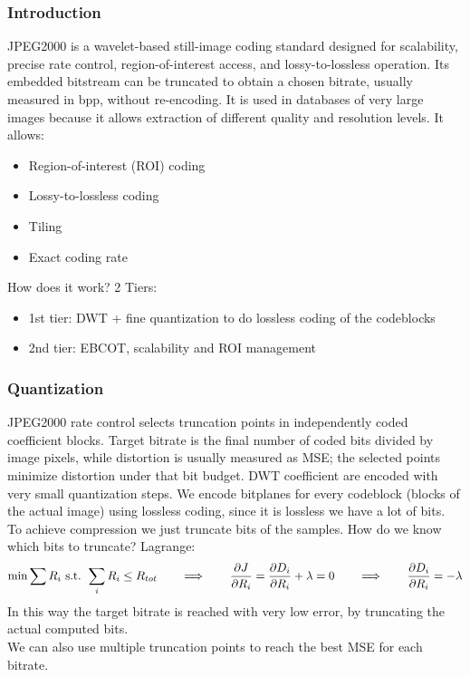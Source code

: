 \subsubsection{Introduction}
JPEG2000 is a wavelet-based still-image coding standard designed for scalability, precise rate control, region-of-interest access, and lossy-to-lossless operation. Its embedded bitstream can be truncated to obtain a chosen bitrate, usually measured in bpp, without re-encoding. It is used in databases of very large images because it allows extraction of different quality and resolution levels. It allows:
\begin{itemize}
    \item Region-of-interest (ROI) coding
    \item Lossy-to-lossless coding
    \item Tiling
    \item Exact coding rate
\end{itemize}
How does it work? 2 Tiers:
\begin{itemize}
    \item 1st tier: DWT + fine quantization to do lossless coding of the codeblocks
    \item 2nd tier: EBCOT, scalability and ROI management
\end{itemize}
\subsubsection{Quantization}
JPEG2000 rate control selects truncation points in independently coded coefficient blocks. Target bitrate is the final number of coded bits divided by image pixels, while distortion is usually measured as MSE; the selected points minimize distortion under that bit budget.
DWT coefficient are encoded with very small quantization steps. We encode bitplanes for every codeblock (blocks of the actual image) using lossless coding, since it is lossless we have a lot of bits.\\
To achieve compression we just truncate bits of the samples. How do we know which bits to truncate? Lagrange:
$$\min\sum R_i \text{ s.t. }\sum_{i}^{}R_i \leq R_{tot} \qquad \Longrightarrow \qquad \frac{\partial J}{\partial R_i} = \frac{\partial D_i}{\partial R_i} + \lambda = 0 \qquad\Longrightarrow\qquad \frac{\partial D_i}{\partial R_i} = -\lambda$$
In this way the target bitrate is reached with very low error, by truncating the actual computed bits.\\
We can also use multiple truncation points to reach the best MSE for each bitrate.
